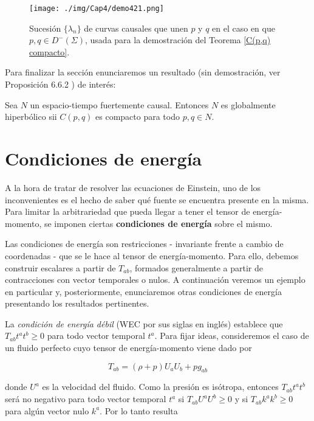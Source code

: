 \begin{figure}[h]
    \centering
    \texttt{[image: ./img/Cap4/demo421.png]}
    \caption{Sucesión $\{\lambda_n\}$ de curvas causales que unen $p$ y $q$ en el caso en que $p,q\in D^-(\Sigma)$, usada para la demostración del Teorema \ref{C(p,q) compacto}.}
    \label{demoC(p,q)}
\end{figure}


Para finalizar la sección enunciaremos un resultado (sin demostración, ver \citep{1975lsss.book.....H} Proposición 6.6.2 ) de interés:


\begin{proposition}
Sea $N$ un espacio-tiempo fuertemente causal. Entonces $N$ es globalmente hiperbólico sii $C(p,q)$ es compacto para todo $p,q \in N$. 
\end{proposition}





    
\section{Condiciones de energía}



A la hora de tratar de resolver las ecuaciones de Einstein, uno de los inconvenientes es el hecho de saber qué fuente se encuentra presente en la misma. Para limitar la arbitrariedad que pueda llegar a tener el tensor de energía-momento, se imponen ciertas \textbf{condiciones de energía} sobre el mismo.

Las condiciones de energía son restricciones - invariante frente a cambio de coordenadas - que se le hace al tensor de energía-momento. Para ello, debemos construir escalares a partir de $T_{ab}$, formados generalmente a partir de contracciones con vector temporales o nulos. A continuación veremos un ejemplo en particular y, posteriormente, enunciaremos otras condiciones de energía presentando los resultados pertinentes.

La \textit{condición de energía débil} (WEC por sus siglas en inglés) establece que $T_{ab}t^at^b\geq 0$ para todo vector temporal $t^a$. Para fijar ideas, consideremos el caso de un fluido perfecto cuyo tensor de energía-momento viene dado por

\[ T_{ab}=(\rho+p)U_aU_b+pg_{ab}\]


donde $U^a$ es la velocidad del fluido. Como la presión es isótropa, entonces $T_{ab}t^at^b$ será no negativo para todo vector temporal $t^a$ si $T_{ab}U^aU^b\geq0$ y si $T_{ab}k^ak^b\geq0$ para algún vector nulo $k^a$. Por lo tanto resulta

